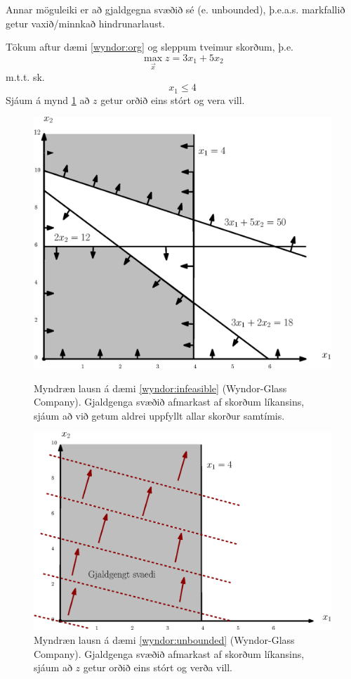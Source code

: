 Annar möguleiki er að gjaldgegna svæðið sé  (e. unbounded), þ.e.a.s. markfallið getur vaxið/minnkað hindrunarlaust.

\begin{daemi}\label{wyndor:unbounded}
Tökum aftur dæmi \ref{wyndor:org} og sleppum tveimur skorðum, þ.e.
$$\max_{\vec{x}}z=3x_1+5x_2$$
m.t.t. sk.
$$ x_1\leq 4$$
Sjáum á mynd \ref{wyndor:img:unbounded} að $z$ getur orðið eins stórt og vera vill.


\begin{figure}[t!]
\centering
\includegraphics[width=0.75\columnwidth]{figs/wyndor_infeasible.eps}
\caption{Myndræn lausn á dæmi \ref{wyndor:infeasible} (Wyndor-Glass Company). Gjald\-genga svæðið afmarkast af skorðum líkansins, sjáum að við getum aldrei uppfyllt allar skorður samtímis.}\label{wyndor:img:infeasible}
\includegraphics[width=0.75\columnwidth]{figs/wyndor_unbounded.eps}
\caption{Myndræn lausn á dæmi \ref{wyndor:unbounded} (Wyndor-Glass Company). Gjald\-genga svæðið afmarkast af skorðum líkansins, sjáum að $z$ getur orðið eins stórt og verða vill.}\label{wyndor:img:unbounded}
\end{figure} 
 
\end{daemi}

